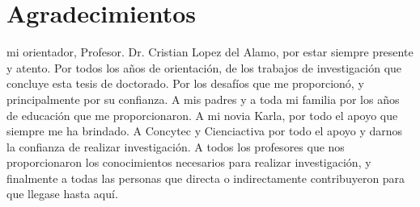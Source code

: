 %
%

\chapter*{Agradecimientos}
\begin{SingleSpace}
 mi orientador, Profesor. Dr. Cristian Lopez del Alamo, por estar siempre presente y atento. Por todos los años de orientación, de los trabajos de investigación que concluye esta tesis de doctorado. Por los desafíos que me proporcionó, y principalmente por su confianza. A mis padres y a toda mi familia por los años de educación que me proporcionaron. A mi  novia  Karla, por todo el apoyo que siempre me ha brindado. A Concytec y Cienciactiva por todo el apoyo y darnos la confianza de realizar investigación.  A todos los profesores que nos proporcionaron los conocimientos necesarios para realizar investigación, y finalmente a todas las personas que directa o indirectamente contribuyeron para que llegase hasta aquí.
\end{SingleSpace}
\clearpage